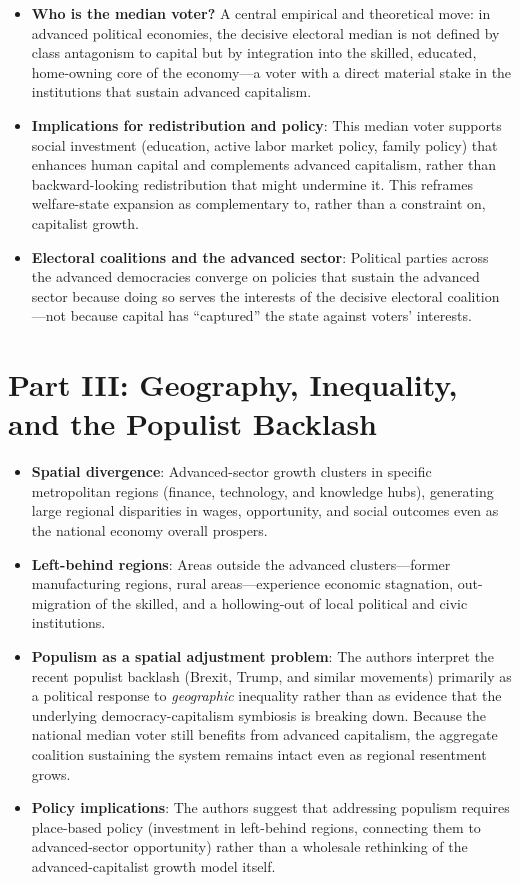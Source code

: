 \documentclass[12pt]{article}
\begin{document}
\begin{itemize}[leftmargin=*, itemsep=4pt]
    \item \textbf{Who is the median voter?} A central empirical and theoretical move: in advanced political economies, the decisive electoral median is not defined by class antagonism to capital but by integration into the skilled, educated, home-owning core of the economy---a voter with a direct material stake in the institutions that sustain advanced capitalism.
    \item \textbf{Implications for redistribution and policy}: This median voter supports social investment (education, active labor market policy, family policy) that enhances human capital and complements advanced capitalism, rather than backward-looking redistribution that might undermine it. This reframes welfare-state expansion as complementary to, rather than a constraint on, capitalist growth.
    \item \textbf{Electoral coalitions and the advanced sector}: Political parties across the advanced democracies converge on policies that sustain the advanced sector because doing so serves the interests of the decisive electoral coalition---not because capital has ``captured'' the state against voters' interests.
\end{itemize}

\section{Part III: Geography, Inequality, and the Populist Backlash}

\begin{itemize}[leftmargin=*, itemsep=4pt]
    \item \textbf{Spatial divergence}: Advanced-sector growth clusters in specific metropolitan regions (finance, technology, and knowledge hubs), generating large regional disparities in wages, opportunity, and social outcomes even as the national economy overall prospers.
    \item \textbf{Left-behind regions}: Areas outside the advanced clusters---former manufacturing regions, rural areas---experience economic stagnation, out-migration of the skilled, and a hollowing-out of local political and civic institutions.
    \item \textbf{Populism as a spatial adjustment problem}: The authors interpret the recent populist backlash (Brexit, Trump, and similar movements) primarily as a political response to \textit{geographic} inequality rather than as evidence that the underlying democracy-capitalism symbiosis is breaking down. Because the national median voter still benefits from advanced capitalism, the aggregate coalition sustaining the system remains intact even as regional resentment grows.
    \item \textbf{Policy implications}: The authors suggest that addressing populism requires place-based policy (investment in left-behind regions, connecting them to advanced-sector opportunity) rather than a wholesale rethinking of the advanced-capitalist growth model itself.
\end{itemize}
\end{document}
